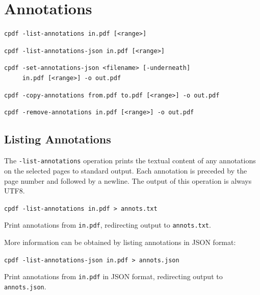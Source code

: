 \documentclass{book}
\begin{document}
\chapter{Annotations}\label{chap:10}
  \begin{framed}
  \small\noindent\verb!cpdf -list-annotations in.pdf [<range>]!

  \vspace{1.5mm}
  \small\noindent\verb!cpdf -list-annotations-json in.pdf [<range>]!

  \vspace{1.5mm}
  \small\noindent\verb!cpdf -set-annotations-json <filename> [-underneath]!\\
  \noindent\verb!     in.pdf [<range>] -o out.pdf!

  \vspace{1.5mm}
  \small\noindent\verb!cpdf -copy-annotations from.pdf to.pdf [<range>] -o out.pdf!

  \vspace{1.5mm}
  \small\noindent\verb!cpdf -remove-annotations in.pdf [<range>] -o out.pdf!
  \end{framed}

  \section{Listing Annotations}
  The \texttt{-list-annotations} operation prints the textual content of any
annotations on the selected pages to standard output. Each annotation is preceded by the page number and followed by a newline. The output of this operation is always UTF8.
  \begin{framed}
    \noindent\small\verb!cpdf -list-annotations in.pdf > annots.txt!
    
    \vspace{2.5mm}
    \noindent Print annotations from \texttt{in.pdf}, redirecting output to \texttt{annots.txt}.
  \end{framed}

\noindent More information can be obtained by listing annotations in JSON format:

  \begin{framed}
    \noindent\small\verb!cpdf -list-annotations-json in.pdf > annots.json!
    
    \vspace{2.5mm}
    \noindent Print annotations from \texttt{in.pdf} in JSON format, redirecting output to \texttt{annots.json}.
  \end{framed}
\end{document}
